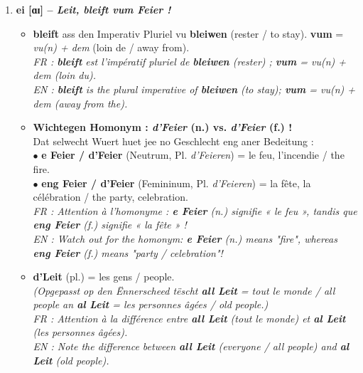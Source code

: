 \begin{enumerate}
    \item \textbf{ei {[ɑɪ]} -- \textit{Leit, bleift vum Feier !}}
    \begin{itemize}
        \item \textbf{bleift} ass den Imperativ Pluriel vu \textbf{bleiwen} (rester / to stay). \textbf{vum} = \textit{vu(n) + dem} (loin de / away from). \\
        \textit{FR : \textbf{bleift} est l'impératif pluriel de \textbf{bleiwen} (rester) ; \textbf{vum} = \textit{vu(n) + dem} (loin du).} \\
        \textit{EN : \textbf{bleift} is the plural imperative of \textbf{bleiwen} (to stay); \textbf{vum} = \textit{vu(n) + dem} (away from the).}
        \item \textbf{Wichtegen Homonym : \textit{d'Feier} (n.) vs. \textit{d'Feier} (f.) !} \\
        Dat selwecht Wuert huet jee no Geschlecht eng aner Bedeitung : \\
        $\bullet$ \textbf{e Feier / d'Feier} (Neutrum, Pl. \textit{d'Feieren}) = le feu, l'incendie / the fire. \\
        $\bullet$ \textbf{eng Feier / d'Feier} (Femininum, Pl. \textit{d'Feieren}) = la fête, la célébration / the party, celebration. \\
        \textit{FR : Attention à l'homonyme : \textbf{e Feier} (n.) signifie « le feu », tandis que \textbf{eng Feier} (f.) signifie « la fête » !} \\
        \textit{EN : Watch out for the homonym: \textbf{e Feier} (n.) means "fire", whereas \textbf{eng Feier} (f.) means "party / celebration"!}
        \item \textbf{d'Leit} (pl.) = les gens / people. \\
        \textit{(Opgepasst op den Ënnerscheed tëscht \textbf{all Leit} = tout le monde / all people an \textbf{al Leit} = les personnes âgées / old people.)} \\
        \textit{FR : Attention à la différence entre \textbf{all Leit} (tout le monde) et \textbf{al Leit} (les personnes âgées).} \\
        \textit{EN : Note the difference between \textbf{all Leit} (everyone / all people) and \textbf{al Leit} (old people).}
    \end{itemize}

    \vspace{0.3em}


\end{enumerate}
